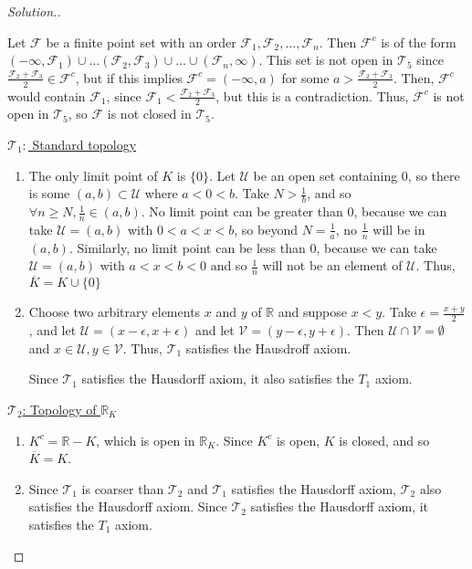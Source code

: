 \documentclass{article}
\newcommand{\T}{\mathcal{T}}
\newcommand{\U}{\mathcal{U}}
\newcommand{\R}{\mathbb{R}}
\newcommand{\V}{\mathcal{V}}
\newcommand{\F}{\mathcal{F}}
\newcommand{\sk}{\smallskip}
\begin{document}
\begin{enumerate}
\begin{proof}[Solution.]
\begin{enumerate}
            \sk 
    
            Let $\F$ be a finite point set with an order $\F_1, \F_2, \dots, \F_n$. Then $\F^c$ is of the form $(-\infty, \F_1) \cup \dots (\F_2, \F_3) \cup \dots \cup (\F_n, \infty)$. This set is not open in $\T_5$ since $\frac{\F_2 + \F_3}{2} \in \F^c$, but if this implies $\F^c = (-\infty, a)$ for some $a > \frac{\F_2 + \F_3}{2}$. Then, $\F^c$ would contain $\F_1$, since $\F_1 < \frac{\F_2 + \F_3}{2}$, but this is a contradiction. Thus, $\F^c$ is not open in $\T_5$, so $\F$ is not closed in $\T_5$. 
        \end{enumerate}
    
        \underline{$\T_1:$ Standard topology}
        \begin{enumerate}
            \item The only limit point of $K$ is $\{0\}$. Let $\U$ be an open set containing 0, so there is some $(a, b) \subset \U$ where $a < 0 < b$. Take $N > \frac{1}{b}$, and so $\forall n \geq N, \frac{1}{n} \in (a, b)$. No limit point can be greater than $0$, because we can take $\U = (a, b)$ with $0 < a < x < b$, so beyond $N = \frac{1}{a}$, no $\frac{1}{n}$ will be in $(a, b)$. Similarly, no limit point can be less than 0, because we can take $\U = (a, b)$ with $a < x < b < 0$ and so $\frac{1}{n}$ will not be an element of $\U$. Thus, $\overline{K} = K \cup \{0\}$
            \item Choose two arbitrary elements $x$ and $y$ of $\R$ and suppose $x < y$. Take $\epsilon = \frac{x + y}{2}$, and let $\U = (x - \epsilon, x + \epsilon)$ and let $\V = (y - \epsilon, y + \epsilon)$. Then $\U \cap \V = \emptyset$ and $x \in \U, y \in \V$. Thus, $\T_1$ satisfies the Hausdroff axiom. 
    
            \sk
    
            Since $\T_1$ satisfies the Hausdorff axiom, it also satisfies the $T_1$ axiom. 
        \end{enumerate}
    
        \underline{$\T_2$: Topology of $\R_K$}
        \begin{enumerate}
            \item $K^c = \R - K$, which is open in $\R_K$. Since $K^c$ is open, $K$ is closed, and so $\overline{K} = K$.
    
            \item Since $\T_1$ is coarser than $\T_2$ and $\T_1$ satisfies the Hausdorff axiom, $\T_2$ also satisfies the Hausdorff axiom. Since $\T_2$ satisfies the Hausdorff axiom, it satisfies the $T_1$ axiom.
        \end{enumerate}
    

\end{proof}
\end{enumerate}
\end{document}
